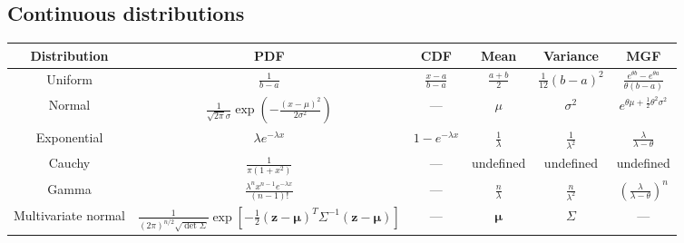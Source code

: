 \documentclass[a4paper]{article}
\begin{document}
\begin{landscape}
\subsection{Continuous distributions}
\begin{center}
  \begin{tabular}{cccccc}
    \toprule
    \textbf{Distribution} & \textbf{PDF} & \textbf{CDF} & \textbf{Mean} & \textbf{Variance} & \textbf{MGF} \\
    \midrule
    Uniform & $\displaystyle\frac{1}{b - a}$ & $\displaystyle\frac{x - a}{b - a}$ & $\displaystyle\frac{a + b}{2}$ & $\displaystyle \frac{1}{12}(b - a)^2$ & $\displaystyle\frac{e^{\theta b} - e^{\theta a}}{\theta (b - a)}$ \\
    Normal & $\displaystyle \frac{1}{\sqrt{2\pi}\sigma}\exp\left(-\frac{(x - \mu)^2}{2\sigma^2}\right)$ & --- & $\mu$ & $\sigma^2$ & $e^{\theta\mu + \frac{1}{2}\theta^2\sigma^2}$\\
    Exponential & $\lambda e^{-\lambda x}$ & $1 - e^{-\lambda x}$ & $\displaystyle \frac{1}{\lambda}$ & $\displaystyle\frac{1}{\lambda^2}$ & $\displaystyle\frac{\lambda}{\lambda - \theta}$ \\
    Cauchy & $\displaystyle \frac{1}{\pi(1 + x^2)}$ & --- & undefined & undefined & undefined\\
    Gamma & $\displaystyle \frac{\lambda^n x^{n - 1}e^{-\lambda x}}{(n - 1)!}$ & --- & $\displaystyle\frac{n}{\lambda}$ & $\displaystyle \frac{n}{\lambda^2}$ & $\displaystyle\left(\frac{\lambda}{\lambda - \theta}\right)^n$ \\
    Multivariate normal & $\displaystyle \frac{1}{(2\pi)^{n/2}\sqrt{\det \Sigma}} \exp\left[-\frac{1}{2}(\mathbf{z} - \boldsymbol\mu)^T\Sigma^{-1}(\mathbf{z} - \boldsymbol\mu)\right]$ & --- & $\boldsymbol\mu$ & $\Sigma$ & ---\\
    \bottomrule
  \end{tabular}
\end{center}
\end{landscape}
\fi
\end{document}
